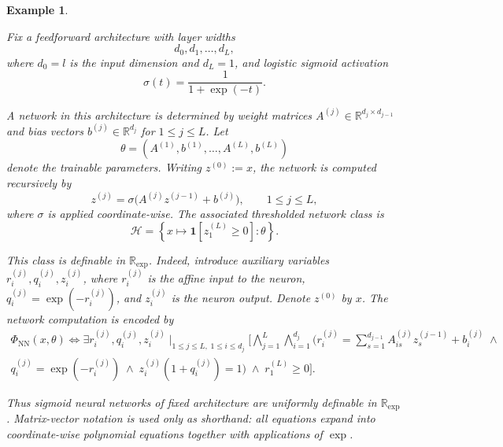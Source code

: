\documentclass[11pt]{article}
\theoremstyle{plain}
\newtheorem{example}{Example}[section]
\theoremstyle{definition}
\theoremstyle{remark}
\newcommand{\R}{\mathbb{R}}
\begin{document}
\begin{example}
\label{app:example-nn-definability}

Fix a feedforward architecture with layer widths
\[
d_0,d_1,\dots,d_L,
\]
where \(d_0=l\) is the input dimension and $d_L = 1$, and logistic sigmoid activation
\[
\sigma(t)=\frac{1}{1+\exp(-t)}.
\]

A network in this architecture is determined by weight matrices
\(A^{(j)}\in\R^{d_j\times d_{j-1}}\) and bias vectors
\(b^{(j)}\in\R^{d_j}\) for \(1\le j\le L\). Let
\[
\theta=(A^{(1)},b^{(1)},\dots,A^{(L)},b^{(L)})
\]
denote the trainable parameters. Writing \(z^{(0)}:=x\), the network is
computed recursively by
\[
z^{(j)}
=
\sigma\bigl(A^{(j)}z^{(j-1)}+b^{(j)}\bigr),
\qquad
1\le j\le L,
\]
where \(\sigma\) is applied coordinate-wise. The associated thresholded network
class is
\[
\mathcal H
=
\left\{
x\mapsto \mathbf 1[z^{(L)}_1\ge 0]
:
\theta
\right\}.
\]

This class is definable in \(\R_{\exp}\). Indeed, introduce auxiliary variables
\(r_i^{(j)},q_i^{(j)},z_i^{(j)}\), where \(r_i^{(j)}\) is the affine input to
the neuron, \(q_i^{(j)}=\exp(-r_i^{(j)})\), and \(z_i^{(j)}\) is the neuron
output. Denote $z^{(0)}$ by $x$. The network computation is encoded by
\begin{multline*}
\Phi_{\mathrm{NN}}(x,\theta)
\iff
\exists
r_i^{(j)},q_i^{(j)},z_i^{(j)}
\mid_{1\le j\le L,\;1\le i\le d_j}
\Bigg[
\bigwedge_{j=1}^L
\bigwedge_{i=1}^{d_j}
\Bigg(
r_i^{(j)}
=
\sum_{s=1}^{d_{j-1}}
A^{(j)}_{is} z_s^{(j-1)}
+
b_i^{(j)}
\;\land \\[0.3em]
q_i^{(j)}
=
\exp(-r_i^{(j)})
\;\land\;
z_i^{(j)}(1+q_i^{(j)})=1
\Bigg)
\;\land\;
r^{(L)}_1\ge 0
\Bigg].
\end{multline*}

Thus sigmoid neural networks of fixed architecture are uniformly definable in
\(\R_{\exp}\). Matrix-vector notation is used only as shorthand: all equations
expand into coordinate-wise polynomial equations together with applications of
\(\exp\).
\end{example}
\end{document}
